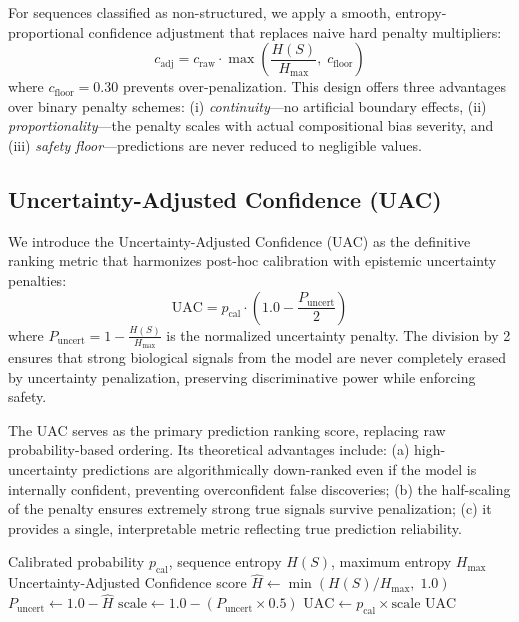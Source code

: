 \documentclass[conference]{IEEEtran}
\begin{document}
For sequences classified as non-structured, we apply a smooth, entropy-proportional confidence adjustment that replaces naive hard penalty multipliers:
\begin{equation}
    c_{\text{adj}} = c_{\text{raw}} \cdot \max\!\left(\frac{H(S)}{H_{\max}},\; c_{\text{floor}}\right)
    \label{eq:smooth}
\end{equation}
where $c_{\text{floor}} = 0.30$ prevents over-penalization. This design offers three advantages over binary penalty schemes: (i) \textit{continuity}---no artificial boundary effects, (ii) \textit{proportionality}---the penalty scales with actual compositional bias severity, and (iii) \textit{safety floor}---predictions are never reduced to negligible values.

\subsection{Uncertainty-Adjusted Confidence (UAC)}

We introduce the Uncertainty-Adjusted Confidence (UAC) as the definitive ranking metric that harmonizes post-hoc calibration with epistemic uncertainty penalties:
\begin{equation}
    \text{UAC} = p_{\text{cal}} \cdot \left(1.0 - \frac{P_{\text{uncert}}}{2}\right)
    \label{eq:uac}
\end{equation}
where $P_{\text{uncert}} = 1 - \frac{H(S)}{H_{\max}}$ is the normalized uncertainty penalty. The division by 2 ensures that strong biological signals from the model are never completely erased by uncertainty penalization, preserving discriminative power while enforcing safety.

The UAC serves as the primary prediction ranking score, replacing raw probability-based ordering. Its theoretical advantages include: (a) high-uncertainty predictions are algorithmically down-ranked even if the model is internally confident, preventing overconfident false discoveries; (b) the half-scaling of the penalty ensures extremely strong true signals survive penalization; (c) it provides a single, interpretable metric reflecting true prediction reliability.

\begin{algorithm}[t]
\caption{UAC Computation}
\label{alg:uac}
\begin{algorithmic}[1]
\Require Calibrated probability $p_{\text{cal}}$, sequence entropy $H(S)$, maximum entropy $H_{\max}$
\Ensure Uncertainty-Adjusted Confidence score
\State $\hat{H} \gets \min(H(S) / H_{\max},\; 1.0)$ 
\State $P_{\text{uncert}} \gets 1.0 - \hat{H}$ 
\State $\text{scale} \gets 1.0 - (P_{\text{uncert}} \times 0.5)$ 
\State $\text{UAC} \gets p_{\text{cal}} \times \text{scale}$
\State \Return $\text{UAC}$
\end{algorithmic}
\end{algorithm}
\end{document}
